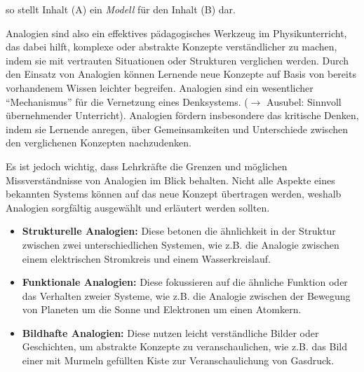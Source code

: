 so stellt Inhalt (A) ein \textit{Modell} f\"{u}r den Inhalt (B) dar.

\bip
Analogien sind also ein effektives p\"{a}dagogisches Werkzeug im Physikunterricht, das dabei hilft, komplexe oder abstrakte Konzepte verst\"{a}ndlicher zu machen, indem sie mit vertrauten Situationen oder Strukturen verglichen werden. Durch den Einsatz von Analogien k\"{o}nnen Lernende neue Konzepte auf Basis von bereits vorhandenem Wissen leichter begreifen. Analogien sind ein wesentlicher ``Mechanismus'' f\"{u}r die Vernetzung eines Denksystems. ($\to$ Ausubel: Sinnvoll \"{u}bernehmender Unterricht). Analogien f\"{o}rdern insbesondere das kritische Denken, indem sie Lernende anregen, \"{u}ber Gemeinsamkeiten und Unterschiede zwischen den verglichenen Konzepten nachzudenken.

\bip
Es ist jedoch wichtig, dass Lehrkr\"{a}fte die Grenzen und m\"{o}glichen Missverst\"{a}ndnisse von Analogien im Blick behalten. Nicht alle Aspekte eines bekannten Systems k\"{o}nnen auf das neue Konzept \"{u}bertragen werden, weshalb Analogien sorgf\"{a}ltig ausgew\"{a}hlt und erl\"{a}utert werden sollten.

\bip
{}

\begin{itemize}
\item{\textbf{Strukturelle Analogien:} Diese betonen die \"{a}hnlichkeit in der Struktur zwischen zwei unterschiedlichen Systemen, wie z.B. die Analogie zwischen einem elektrischen Stromkreis und einem Wasserkreislauf.}
\item{\textbf{Funktionale Analogien:} Diese fokussieren auf die \"{a}hnliche Funktion oder das Verhalten zweier Systeme, wie z.B. die Analogie zwischen der Bewegung von Planeten um die Sonne und Elektronen um einen Atomkern.}
\item{\textbf{Bildhafte Analogien:} Diese nutzen leicht verst\"{a}ndliche Bilder oder Geschichten, um abstrakte Konzepte zu veranschaulichen, wie z.B. das Bild einer mit Murmeln gef\"{u}llten Kiste zur Veranschaulichung von Gasdruck.}
\end{itemize}


